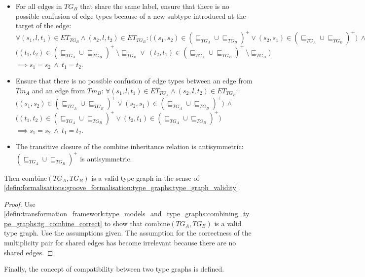 \begin{lem}
\begin{itemize}
    \item For all edges in $TG_B$ that share the same label, ensure that there is no possible confusion of edge types because of a new subtype introduced at the target of the edge: $\forall (s_1, l, t_1) \in ET_{TG_B} \land (s_2, l, t_2) \in ET_{TG_B}\!: \big((s_1, s_2) \in (\sqsubseteq_{TG_A} \cup \sqsubseteq_{TG_B})^+ \lor (s_2, s_1) \in (\sqsubseteq_{TG_A} \cup \sqsubseteq_{TG_B})^+\big)\ \land$\\$\big((t_1, t_2) \in (\sqsubseteq_{TG_A} \cup \sqsubseteq_{TG_B})^+\ \setminus \sqsubseteq_{TG_{B}}\!\! \lor\ (t_2, t_1) \in (\sqsubseteq_{TG_A} \cup \sqsubseteq_{TG_B})^+\ \setminus \sqsubseteq_{TG_{B}}\!\!\big)$\\$\implies s_1 = s_2\ \land\ t_1 = t_2$.
    \item Ensure that there is no possible confusion of edge types between an edge from $Tm_A$ and an edge from $Tm_B$: $\forall (s_1, l, t_1) \in ET_{TG_A} \land (s_2, l, t_2) \in ET_{TG_B}\!:$\\$\big((s_1, s_2) \in (\sqsubseteq_{TG_A} \cup \sqsubseteq_{TG_B})^+ \lor (s_2, s_1) \in (\sqsubseteq_{TG_A} \cup \sqsubseteq_{TG_B})^+\big)\ \land$\\$\big((t_1, t_2) \in (\sqsubseteq_{TG_A} \cup \sqsubseteq_{TG_B})^+ \lor (t_2, t_1) \in (\sqsubseteq_{TG_A} \cup \sqsubseteq_{TG_B})^+\big)$\\$\implies s_1 = s_2\ \land\ t_1 = t_2$.
    \item The transitive closure of the combine inheritance relation is antisymmetric: $(\sqsubseteq_{TG_A} \cup \sqsubseteq_{TG_B})^+$ is antisymmetric.
\end{itemize}

Then $\mathrm{combine}(TG_A, TG_B)$ is a valid type graph in the sense of \cref{defin:formalisations:groove_formalisation:type_graphs:type_graph_validity}.
\end{lem}

\begin{proof}
Use \cref{defin:transformation_framework:type_models_and_type_graphs:combining_type_graphs:tg_combine_correct} to show that $\mathrm{combine}(TG_A, TG_B)$ is a valid type graph. Use the assumptions given. The assumption for the correctness of the multiplicity pair for shared edges has become irrelevant because there are no shared edges.
\end{proof}

Finally, the concept of compatibility between two type graphs is defined.

